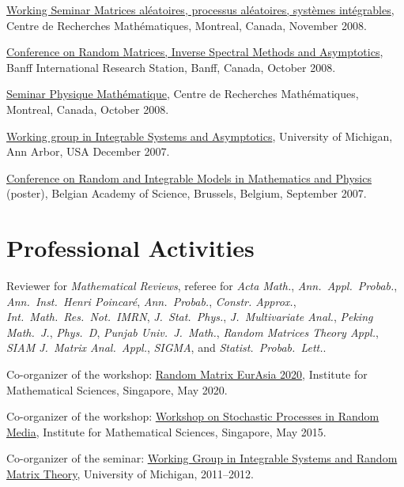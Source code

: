 \documentclass[12pt,a4paper]{article}
\newenvironment{item_list}{
 \begin{list}{}{
   \setlength{\leftmargin}{1.5em}
   \setlength{\itemsep}{0.25em}
   \setlength{\parskip}{0pt}
   \setlength{\parsep}{0.25em}
 }
}{
 \end{list}
}
\begin{document}
\begin{item_list}
\item
  \href{http://www.crm.umontreal.ca/cal/en/mois200811.html}{Working Seminar Matrices al\'{e}atoires, processus al\'{e}atoires, syst\`{e}mes int\'{e}grables}, Centre de Recherches Math\'{e}matiques, Montreal, Canada, November 2008.
\item
  \href{http://www.birs.ca/events/2008/5-day-workshops/08w5017}{Conference on Random Matrices, Inverse Spectral Methods and Asymptotics}, Banff International Research Station, Banff, Canada, October 2008.
\item
  \href{http://www.crm.umontreal.ca/cal/en/mois200810.html}{Seminar Physique Math\'{e}matique}, Centre de Recherches Math\'{e}matiques, Montreal, Canada, October 2008.
\item
  \href{http://www.math.lsa.umich.edu/~millerpd/WGISA_archives/WGISA_Fall_07.html}{Working group in Integrable Systems and Asymptotics}, University of Michigan, Ann Arbor, USA December 2007.
\item
  \href{http://magelhaes.hzs.be/RIMMP/}{Conference on Random and Integrable Models in Mathematics and Physics} (poster), Belgian Academy of Science, Brussels, Belgium, September 2007.
\end{item_list}

\section*{Professional Activities}

\begin{item_list}
\item Reviewer for \textit{Mathematical Reviews}, referee for \textit{Acta Math.}, \textit{Ann.\ Appl.\ Probab.}, \textit{Ann.\ Inst.\ Henri Poincar\'{e}}, \textit{Ann.\ Probab.}, \textit{Constr. Approx.}, \textit{Int.\ Math.\ Res.\ Not.\ IMRN}, \textit{J.\ Stat.\ Phys.}, \textit{J.\ Multivariate Anal.}, \textit{Peking Math.\ J.}, \textit{Phys.\ D}, \textit{Punjab Univ.\ J.\ Math.}, \textit{Random Matrices Theory Appl.}, \textit{SIAM J.\ Matrix Anal.\ Appl.}, \textit{SIGMA}, and \textit{Statist.\ Probab.\ Lett.}.
\item Co-organizer of the workshop:
  \href{https://ims.nus.edu.sg/events/2020/random/index.php}{Random Matrix EurAsia 2020}, Institute for Mathematical Sciences, Singapore, May 2020.
\item Co-organizer of the workshop:
  \href{http://www2.ims.nus.edu.sg/Programs/015wrandom/index.php}{Workshop on Stochastic Processes in Random Media}, Institute for Mathematical Sciences, Singapore, May 2015.
\item Co-organizer of the seminar:
  \href{http://www.math.lsa.umich.edu/seminars_events/events.php?eventdefid=43&dt_begin=2011-07-01&dt_end=2011-12-31}
  {Working Group in Integrable Systems and Random Matrix Theory}, University of Michigan, 2011--2012.
\end{item_list}
\end{document}
